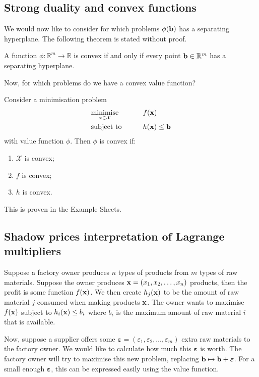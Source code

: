 \subsection{Strong duality and convex functions}
We would now like to consider for which problems \( \phi(\vb b) \) has a separating hyperplane.
The following theorem is stated without proof.
\begin{theorem}
	A function \( \phi \colon \mathbb R^m \to \mathbb R \) is convex if and only if every point \( \vb b \in \mathbb R^m \) has a separating hyperplane.
\end{theorem}
Now, for which problems do we have a convex value function?
\begin{theorem}
	Consider a minimisation problem
	\begin{alignat*}{2}
		 & \underset{\vb x \in \mathcal X}{\text{minimise}} & \qquad & f(\vb x)            \\
		 & \text{subject to}                                &        & h(\vb x) \leq \vb b
	\end{alignat*}
	with value function \( \phi \).
	Then \( \phi \) is convex if:
	\begin{enumerate}
		\item \( \mathcal X \) is convex;
		\item \( f \) is convex;
		\item \( h \) is convex.
	\end{enumerate}
\end{theorem}
\noindent This is proven in the Example Sheets.

\subsection{Shadow prices interpretation of Lagrange multipliers}
Suppose a factory owner produces \( n \) types of products from \( m \) types of raw materials.
Suppose the owner produces \( \vb x = (x_1, x_2, \dots, x_n) \) products, then the profit is some function \( f(\vb x) \).
We then create \( h_j(\vb x) \) to be the amount of raw material \( j \) consumed when making products \( \vb x \).
The owner wants to maximise \( f(\vb x) \) subject to \( h_i(\vb x) \leq b_i \) where \( b_i \) is the maximum amount of raw material \( i \) that is available.

Now, suppose a supplier offers some \( \bm\varepsilon = (\varepsilon_1, \varepsilon_2, \dots, \varepsilon_m) \) extra raw materials to the factory owner.
We would like to calculate how much this \( \bm\varepsilon \) is worth.
The factory owner will try to maximise this new problem, replacing \( \vb b \mapsto \vb b + \bm\varepsilon \).
For a small enough \( \bm\varepsilon \), this can be expressed easily using the value function.

